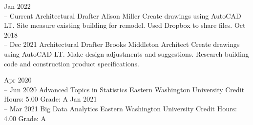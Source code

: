 \documentclass[11pt]{developercv} %
\newcommand{\vsp}{\vspace{-10pt}}
\begin{document}
\vsp



\begin{entrylist}
	\entry
		{Jan 2022 \\
		-- Current}
		{Architectural Drafter}
		{Alison Miller}
		{Create drawings using AutoCAD LT. Site measure existing building for remodel. Used Dropbox to share files.}
	\entry
		{Oct 2018 \\
		-- Dec 2021}
		{Architectural Drafter}
		{Brooks Middleton Architect}
		{Create drawings using AutoCAD LT. Make design adjustments and suggestions. Research building code and construction product specifications.}
\end{entrylist}

\vsp



\begin{entrylist}
	\entry
		{Apr 2020 \\
		-- Jun 2020}
		{Advanced Topics in Statistics}
		{Eastern Washington University}
		{Credit Hours: 5.00 \hspace{100pt} Grade: A}
	\entry
		{Jan 2021 \\
		-- Mar 2021}
		{Big Data Analytics}
		{Eastern Washington University}
		{Credit Hours: 4.00 \hspace{100pt} Grade: A}
\end{entrylist}
\end{document}
